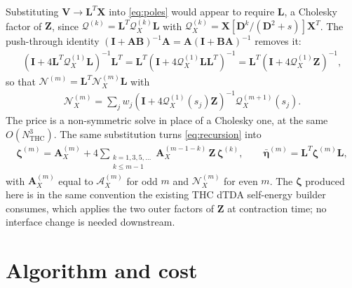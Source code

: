 \documentclass[11pt]{article}
\newcommand{\mat}[1]{{\mathbf{#1}}}
\newcommand{\parth}[1]{\left(#1\right)}
\newcommand{\Dcal}{\mathcal{A}}
\newcommand{\Qcal}{\mathcal{Q}}
\newcommand{\Ncal}{\mathcal{N}}
\begin{document}
Substituting $\mat{V} \to \mat{L}^T\mat{X}$ into \eqref{eq:poles} would appear to require
$\mat{L}$, a Cholesky factor of $\mat{Z}$, since $\Qcal^{(k)} = \mat{L}^T \Qcal_X^{(k)}
\mat{L}$ with $\Qcal_X^{(k)} = \mat{X}[\mat{D}^k/(\mat{D}^2+s)]\mat{X}^T$. The push-through
identity $(\mat{I}+\mat{A}\mat{B})^{-1}\mat{A} = \mat{A}(\mat{I}+\mat{B}\mat{A})^{-1}$
removes it:
\begin{align}
    \parth{\mat{I} + 4\mat{L}^T \Qcal_X^{(1)} \mat{L}}^{-1} \mat{L}^T
    = \mat{L}^T \parth{\mat{I} + 4 \Qcal_X^{(1)} \mat{L}\mat{L}^T}^{-1}
    = \mat{L}^T \parth{\mat{I} + 4 \Qcal_X^{(1)} \mat{Z}}^{-1} ,
\end{align}
so that $\Ncal^{(m)} = \mat{L}^T \Ncal_X^{(m)} \mat{L}$ with
\begin{align}
    \Ncal_X^{(m)} = \sum_j w_j \parth{\mat{I} + 4\Qcal_X^{(1)}(s_j)\mat{Z}}^{-1}
                      \Qcal_X^{(m+1)}(s_j) .
    \label{eq:NX}
\end{align}
The price is a non-symmetric solve in place of a Cholesky one, at the same
$O(N_{\text{THC}}^3)$. The same substitution turns \eqref{eq:recursion} into
\begin{align}
    \bm\zeta^{(m)}
    = \mat{A}_X^{(m)} + 4 \!\!\sum_{\substack{k=1,3,5,\dots \\ k \le m-1}}\!\!
      \mat{A}_X^{(m-1-k)}\, \mat{Z}\, \bm\zeta^{(k)} ,
    \qquad \bar{\bm\eta}^{(m)} = \mat{L}^T \bm\zeta^{(m)} \mat{L} ,
    \label{eq:zeta}
\end{align}
with $\mat{A}_X^{(m)}$ equal to $\Dcal_X^{(m)}$ for odd $m$ and $\Ncal_X^{(m)}$ for even
$m$. The $\bm\zeta$ produced here is in the same convention the existing THC dTDA
self-energy builder consumes, which applies the two outer factors of $\mat{Z}$ at
contraction time; no interface change is needed downstream.

\section{Algorithm and cost}
\end{document}
